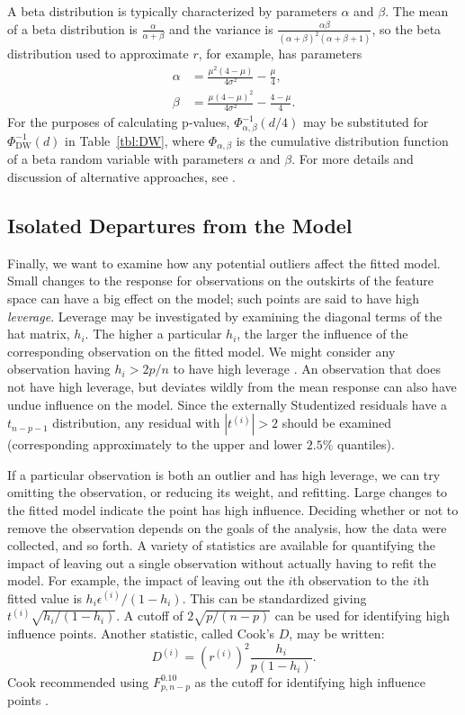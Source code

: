 \documentclass[12pt]{article}
\begin{document}
A beta distribution is typically characterized by parameters $\alpha$ and $\beta$. The mean of a beta distribution is $\frac{\alpha}{\alpha + \beta}$ and the variance is $\frac{\alpha \beta}{(\alpha + \beta)^2 (\alpha + \beta + 1)}$, so the beta distribution used to approximate $r$, for example, has parameters
\begin{align*}
   \alpha &= \frac{\mu^2 ( 4 - \mu)}{4 \sigma^2} - \frac{\mu}{4}, \\
   \beta &= \frac{\mu ( 4 - \mu)^2}{4 \sigma^2} - \frac{4 - \mu}{4}.
\end{align*}
For the purposes of calculating p-values, $\Phi_{\alpha, \beta}^{-1}(d/4)$ may be substituted for $\Phi_{\textrm{DW}}^{-1}(d)$ in Table~\ref{tbl:DW}, where $\Phi_{\alpha, \beta}$ is the cumulative distribution function of a beta random variable with parameters $\alpha$ and $\beta$. For more details and discussion of alternative approaches, see \cite{DW:71}.

\subsection{Isolated Departures from the Model}
Finally, we want to examine how any potential outliers affect the fitted model. Small changes to the response for observations on the outskirts of the feature space can have a big effect on the model; such points are said to have high \textit{leverage}. Leverage may be investigated by examining the diagonal terms of the hat matrix, $h_i$. The higher a particular $h_i$, the larger the influence of the corresponding observation on the fitted model. We might consider any observation having $h_i > 2 p / n$ to have high leverage \cite[10.6.1]{Seber:2003}. An observation that does not have high leverage, but deviates wildly from the mean response can also have undue influence on the model. Since the externally Studentized residuals have a $t_{n-p-1}$ distribution, any residual with $|t^{(i)}| > 2$ should be examined (corresponding approximately to the upper and lower $2.5\%$ quantiles).

If a particular observation is both an outlier and has high leverage, we can try omitting the observation, or reducing its weight, and refitting. Large changes to the fitted model indicate the point has high influence. Deciding whether or not to remove the observation depends on the goals of the analysis, how the data were collected, and so forth. A variety of statistics are available for quantifying the impact of leaving out a single observation without actually having to refit the model\cite[\S~10.6.3]{Seber:2003}. For example, the impact of leaving out the $i$th observation to the $i$th fitted value is $h_i \epsilon^{(i)} / (1 - h_i)$. This can be standardized giving $t^{(i)} \sqrt{h_i / (1 - h_i)}$. A cutoff of $2\sqrt{p / (n-p)}$ can be used for identifying high influence points. Another statistic, called Cook's $D$, may be written:
\begin{displaymath}
   D^{(i)} = \left( r^{(i)} \right)^2 \frac{h_i}{p(1-h_i)}.
\end{displaymath}
Cook recommended using $F_{p, n-p}^{0.10}$ as the cutoff for identifying high influence points \cite{Cook:1977}.
\end{document}
